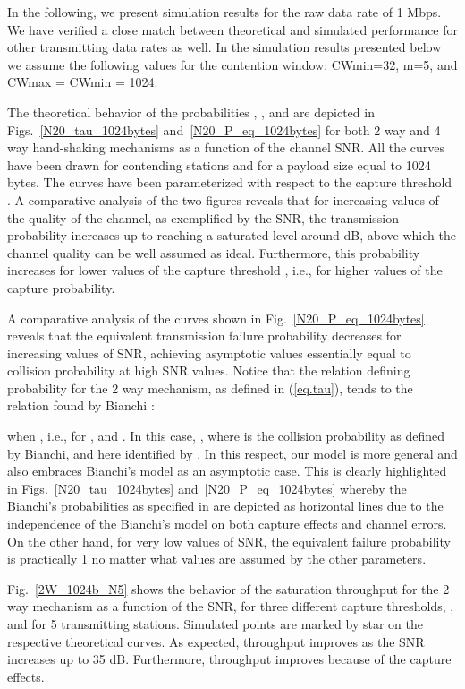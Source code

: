 \documentclass[10pt,onecolumn,a4paper]{IEEEtran}
\begin{document}
In the following, we present simulation results for the raw data
rate of 1 Mbps. We have verified a close match between theoretical
and simulated performance for other transmitting data rates as
well. In the simulation results presented below we assume the
following values for the contention window: CWmin=32, m=5, and
CWmax = CWmin = 1024.

The theoretical behavior of the probabilities , ,
and  are depicted in Figs.~\ref{N20_tau_1024bytes}
and~\ref{N20_P_eq_1024bytes} for both 2 way and 4 way hand-shaking
mechanisms as a function of the channel SNR. All the curves have
been drawn for  contending stations and for a payload size
equal to 1024 bytes. The curves have been parameterized with respect to
the capture threshold . A comparative analysis of the two
figures reveals that for increasing values of the quality of the
channel, as exemplified by the SNR, the transmission probability
 increases up to reaching a saturated level around dB,
above which the channel quality can be well assumed as ideal.
Furthermore, this probability increases for lower values of the
capture threshold , i.e., for higher values of the capture
probability.

A comparative analysis of the curves shown in
Fig.~\ref{N20_P_eq_1024bytes} reveals that the equivalent
transmission failure probability decreases for increasing values
of SNR, achieving asymptotic values essentially equal to collision
probability at high SNR values. Notice that the relation defining
probability  for the 2 way mechanism, as defined in
(\ref{eq.tau}), tends to the relation found by Bianchi
\cite{Bianchi}:

when , i.e., for , and . In this case,
, where  is the collision probability as
defined by Bianchi, and here identified by . In this
respect, our model is more general and also embraces Bianchi's
model as an asymptotic case. This is clearly highlighted in
Figs.~\ref{N20_tau_1024bytes} and~\ref{N20_P_eq_1024bytes} whereby
the Bianchi's probabilities as specified in \cite{Bianchi} are
depicted as horizontal lines due to the independence of the
Bianchi's model on both capture effects and channel errors. On
the other hand, for very low values of SNR, the equivalent failure
probability  is practically 1 no matter what values are
assumed by the other parameters.


Fig.~\ref{2W_1024b_N5} shows the behavior of the saturation
throughput for the 2 way mechanism as a function of the SNR, for
three different capture thresholds, , and for 5 transmitting
stations. Simulated points are marked by star on the respective
theoretical curves. As expected, throughput improves as the SNR
increases up to 35 dB. Furthermore, throughput improves because of
the capture effects.
\end{document}
